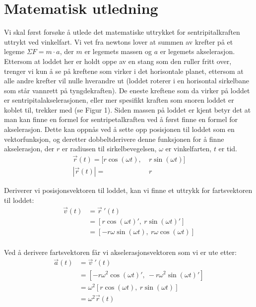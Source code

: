 \documentclass{article}
\begin{document}
\section{Matematisk utledning}
Vi skal først forsøke å utlede det matematiske uttrykket for sentripitalkraften uttrykt ved vinkelfart. Vi vet fra newtons lover at summen av 
krefter på et legeme $\Sigma F = m \cdot a$, der $m$ er legemets massen og $a$ er legemets akselerasjon. 
Ettersom at loddet her er holdt oppe av en stang som den ruller fritt over, trenger vi kun å se på kreftene som virker i det horisontale planet, 
ettersom at alle andre krefter vil nulle hverandre ut (loddet roterer i en horisontal sirkelbane som står vannrett på tyngdekraften).
De eneste kreftene som da virker på loddet er sentripitalakselerasjonen, eller mer spesifikt kraften som snoren loddet er koblet til, trekker med (se Figur 1). 
Siden massen på loddet er kjent betyr det at man kan finne en formel for sentripetalkraften ved å først finne en formel for akselerasjon. 
Dette kan oppnås ved å sette opp posisjonen til loddet som en vektorfunksjon, og deretter dobbeltderivere denne funksjonen for å finne akselerasjon, 
der $r$ er radiusen til sirkelbevegelsen, $\omega$ er vinkelfarten, $t$ er tid.
\begin{align*}
    \vec{r}(t) = [r\cos(\omega t),&\: r\sin(\omega t)]\\
    |\vec{r}(t)| =&\: r
\end{align*}

Deriverer vi posisjonsvektoren til loddet, kan vi finne et uttrykk for fartsvektoren til loddet:
\begin{align*}
    \vec{v}(t) &= \vec{r}\:'(t)\\ 
               &= [r\cos(\omega t)',\: r\sin(\omega t)']\\
               &= [-r\omega\sin(\omega t),\: r\omega\cos(\omega t)]\\
\end{align*}

Ved å derivere fartsvektoren får vi akselerasjonsvektoren som vi er ute etter:
\begin{align*}
    \vec{a}(t) &= \vec{v}\:'(t)\\ 
               &= [-r\omega^2\cos(\omega t)',\: -r\omega^2\sin(\omega t)']\\
               &= \omega^2[r\cos(\omega t),\: r\sin(\omega t)]\\
               &= \omega^2\vec{r}(t)\\
\end{align*}
\end{document}
